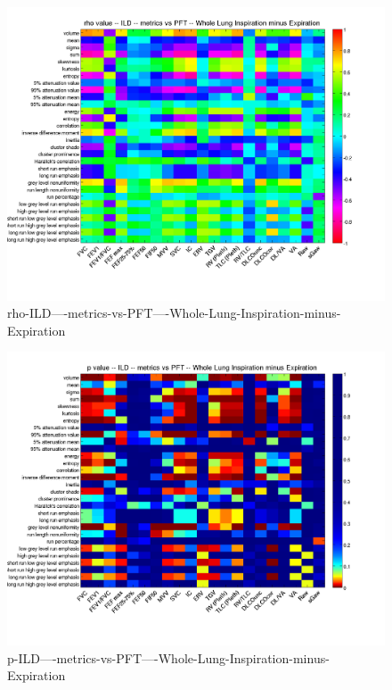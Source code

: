 \documentclass[12pt]{article}
\begin{document}
\begin{figure}
    \includegraphics[width=0.84\linewidth,viewport=100 60 620 550]{corr/rho-ILD----metrics-vs-PFT----Whole-Lung-Inspiration-minus-Expiration.png}
    \caption{rho-ILD----metrics-vs-PFT----Whole-Lung-Inspiration-minus-Expiration}
    \label{fig:rho-ILD----metrics-vs-PFT----Whole-Lung-Inspiration-minus-Expiration}
\end{figure}
\begin{figure}
    \includegraphics[width=0.84\linewidth,viewport=100 60 620 550]{corr/p-ILD----metrics-vs-PFT----Whole-Lung-Inspiration-minus-Expiration.png}
    \caption{p-ILD----metrics-vs-PFT----Whole-Lung-Inspiration-minus-Expiration}
    \label{fig:p-ILD----metrics-vs-PFT----Whole-Lung-Inspiration-minus-Expiration}
\end{figure}
\end{document}
